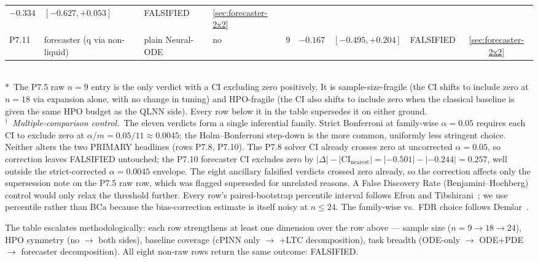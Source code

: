 \begin{table}[t]
\begin{tabular}{llllcrlcc}
  $-0.334$ & $[-0.627, +0.053]$ & FALSIFIED &
  \ref{sec:forecaster-2x2} \\
P7.11 & forecaster (q via non-liquid) & plain Neural-ODE & no & 9 &
  $-0.167$ & $[-0.495, +0.204]$ & FALSIFIED &
  \ref{sec:forecaster-2x2} \\
\bottomrule
\end{tabular}\\[2pt]
\footnotesize
*~The P7.5 raw $n=9$ entry is the only verdict with a CI
excluding zero positively. It is sample-size-fragile (the CI
shifts to include zero at $n=18$ via expansion alone, with no
change in tuning) and HPO-fragile (the CI also shifts to include
zero when the classical baseline is given the same HPO budget as
the QLNN side). Every row below it in the table supersedes it on
either ground.\\[3pt]
$^{\dagger}$~\emph{Multiple-comparison control.}~The eleven verdicts
form a single inferential family. Strict Bonferroni at family-wise
$\alpha = 0.05$ requires each CI to exclude zero at $\alpha / m =
0.05/11 \approx 0.0045$; the Holm--Bonferroni step-down is the more
common, uniformly less stringent choice. Neither alters the two
PRIMARY headlines (rows P7.8, P7.10). The P7.8 solver CI already
crosses zero at uncorrected $\alpha = 0.05$, so correction leaves
FALSIFIED untouched; the P7.10 forecaster CI excludes zero by
$|\Delta| - \mathrm{|CI_{nearest}|} = |{-}0.501| - |{-}0.244| =
0.257$, well outside the strict-corrected $\alpha = 0.0045$ envelope.
The eight ancillary falsified verdicts crossed zero already, so the
correction affects only the supersession note on the P7.5 raw row,
which was flagged superseded for unrelated reasons. A False Discovery
Rate (Benjamini--Hochberg)~\cite{benjamini1995controlling} control
would only relax the threshold further. Every row's paired-bootstrap
percentile interval follows Efron and
Tibshirani~\cite{efron1993introduction}; we use percentile rather
than BCa because the bias-correction estimate is itself noisy at
$n{\le}24$. The family-wise vs.\ FDR choice follows
Dem\v{s}ar~\cite{demsar2006statistical}.
\end{table}

The table escalates methodologically: each row strengthens at least
one dimension over the row above --- sample size ($n=9 \to 18 \to
24$), HPO symmetry (no $\to$ both sides), baseline coverage (cPINN
only $\to$ +LTC decomposition), task breadth (ODE-only $\to$ ODE+PDE
$\to$ forecaster decomposition). All eight non-raw rows return the
same outcome: FALSIFIED.


